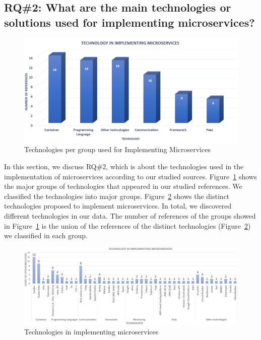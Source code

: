 \subsection{RQ\#2: What are the main technologies or solutions used for implementing microservices?}\label{sec:results-rq2}

\begin{figure}[h]
	\centering
	\includegraphics[width=\linewidth]{images/commtechother.png}
	\caption{Technologies per group used for Implementing Microservices}
	\label{fig:tech-group}
\end{figure}	

In this section, we discuss RQ\#2, which is about the technologies used in the implementation of microservices according to our studied sources. Figure~\ref{fig:tech-group} shows the major groups of technologies that appeared in our studied references. We classified the technologies into \techgroupcount major groups.
Figure~\ref{fig:tech-distinct} shows the distinct technologies proposed to implement microservices. In total, we discovered \techcount different technologies in our data. 
The number of references of the groups showed in Figure~\ref{fig:tech-group} is the union of the references of the distinct technologies (Figure~\ref{fig:tech-distinct}) we classified in each group.  

\begin{figure}[t]
	\centering
	\includegraphics[width=\linewidth]{images/commontechupdated.png}
	\caption{Technologies in implementing microservices }
	\label{fig:tech-distinct}
\end{figure}


